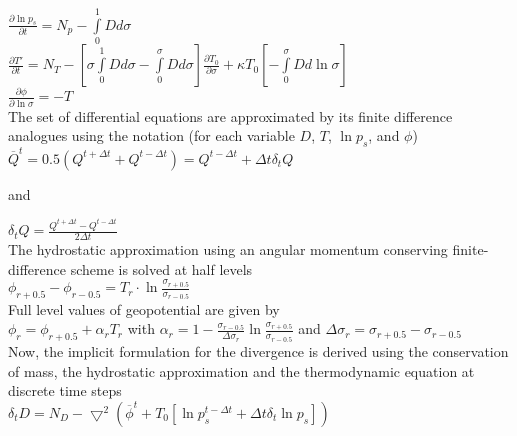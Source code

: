 ${\displaystyle \frac{\partial \ln p_s}{\partial t} 
= N_p - \int\limits_{0}^{1} D d \sigma}$\\


${\displaystyle \frac{\partial T'}{\partial t} = N_T- [ \sigma
  \int\limits_{0}^{1} D d \sigma -  \int\limits_{0}^{\sigma} D d \sigma ]
  \frac{\partial T_0}{\partial \sigma} + \kappa T_0 [-
  \int\limits_{0}^{\sigma} D d \ln  \sigma] }$\\

${\displaystyle \frac{\partial \phi}{\partial \ln \sigma} = - T} $\\


The set of differential equations are approximated 
by its finite difference analogues using the
notation (for each variable $D$, $T$, $\ln p_s$, and $\phi$)\\

${\displaystyle \overline{Q}^t = 0.5 (Q^{t + \Delta t} + Q^{t - \Delta t})
  =Q^{t - \Delta t} + \Delta t \delta_t Q}  $

and

${\displaystyle \delta_t Q = \frac{Q^{t + \Delta t} - Q^{t - \Delta t}}{2 \Delta t}}$\\



The hydrostatic approximation using an angular momentum
conserving finite-difference scheme
is solved at half levels\\

${\displaystyle  \phi_{r+0.5}-\phi_{r-0.5}=
 T_r \cdot \ln \frac{\sigma_{r+0.5}}{\sigma_{r-0.5}}}$\\

Full level values of geopotential are given by\\

${\displaystyle  \phi_{r}=\phi_{r+0.5}+\alpha_r
 T_r }$
with
${\displaystyle  \alpha_r=1-\frac{\sigma_{r-0.5}}{\Delta \sigma_r}
 \ln \frac{\sigma_{r+0.5}}{\sigma_{r-0.5}}}$ 
and
$ \Delta \sigma_r=\sigma_{r+0.5} - \sigma_{r-0.5}$\\


Now, the implicit formulation for the divergence is derived 
using the conservation of mass, the hydrostatic approximation
and the thermodynamic equation at discrete time steps\\

${\displaystyle \delta_t { D} = { N_D} - \bigtriangledown^2 (\overline{\phi}^t + T_0 [\ln p_s^{t - \Delta t} + \Delta t \delta_t \ln p_s])} $\\


